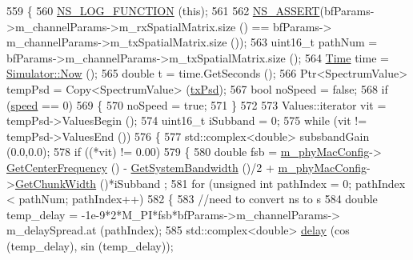 \begin{DoxyCode}
559 \{
560         \hyperlink{log-macros-disabled_8h_a90b90d5bad1f39cb1b64923ea94c0761}{NS\_LOG\_FUNCTION} (\textcolor{keyword}{this});
561 
562         \hyperlink{assert_8h_a6dccdb0de9b252f60088ce281c49d052}{NS\_ASSERT}(bfParams->m\_channelParams->m\_rxSpatialMatrix.size () == bfParams->
      m\_channelParams->m\_txSpatialMatrix.size ());
563         uint16\_t pathNum = bfParams->m\_channelParams->m\_txSpatialMatrix.size ();
564         \hyperlink{namespacens3_1_1TracedValueCallback_a7ffd3e7c142ffe7c8a1d2db9b8de38ec}{Time} time = \hyperlink{classns3_1_1Simulator_ac3178fa975b419f7875e7105be122800}{Simulator::Now} ();
565         \textcolor{keywordtype}{double} t = time.GetSeconds ();
566         Ptr<SpectrumValue> tempPsd = Copy<SpectrumValue> (\hyperlink{lte__link__budget_8m_a684fe3101a5e48a5fcc57cab8dbcd1aa}{txPsd});
567         \textcolor{keywordtype}{bool} noSpeed = \textcolor{keyword}{false};
568         \textcolor{keywordflow}{if} (\hyperlink{mmwave-amc-test_8cc_a6dc6e6f3c75c509ce943163afb5dade7}{speed} == 0)
569         \{
570                 noSpeed = \textcolor{keyword}{true};
571         \}
572 
573         Values::iterator vit = tempPsd->ValuesBegin ();
574         uint16\_t iSubband = 0;
575         \textcolor{keywordflow}{while} (vit != tempPsd->ValuesEnd ())
576         \{
577                 std::complex<double> subsbandGain (0.0,0.0);
578                 \textcolor{keywordflow}{if} ((*vit) != 0.00)
579                 \{
580                         \textcolor{keywordtype}{double} fsb = \hyperlink{classns3_1_1MmWaveChannelRaytracing_a7782dd5b891e4cffae9024b271960891}{m\_phyMacConfig}->
      \hyperlink{classns3_1_1MmWavePhyMacCommon_a0850d2e37c7075b9bce242723b722019}{GetCenterFrequency} () - \hyperlink{classns3_1_1MmWaveChannelRaytracing_a4b1cda4eb5073b8c715d5f89a35ba180}{GetSystemBandwidth} ()/2 + 
      \hyperlink{classns3_1_1MmWaveChannelRaytracing_a7782dd5b891e4cffae9024b271960891}{m\_phyMacConfig}->\hyperlink{classns3_1_1MmWavePhyMacCommon_acc801566d527f1893d67a618ea3be203}{GetChunkWidth} ()*iSubband ;
581                         \textcolor{keywordflow}{for} (\textcolor{keywordtype}{unsigned} \textcolor{keywordtype}{int} pathIndex = 0; pathIndex < pathNum; pathIndex++)
582                         \{
583                                 \textcolor{comment}{//need to convert ns to s}
584                                 \textcolor{keywordtype}{double} temp\_delay = -1e-9*2*M\_PI*fsb*bfParams->m\_channelParams->
      m\_delaySpread.at (pathIndex);
585                                 std::complex<double> \hyperlink{lte_2model_2fading-traces_2fading__trace__generator_8m_a7964e6aa8f61a9d28973c8267a606ad8}{delay} (cos (temp\_delay), sin (temp\_delay));

\end{DoxyCode}
